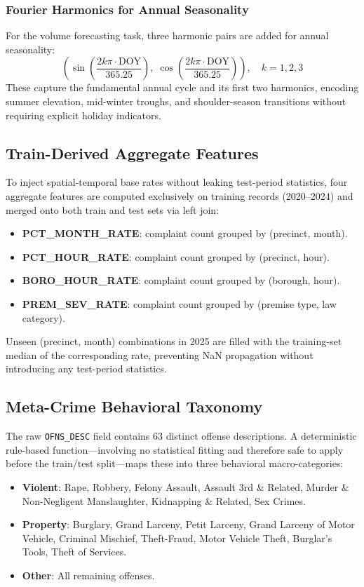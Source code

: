 \documentclass[conference]{IEEEtran}
\begin{document}
\subsubsection{Fourier Harmonics for Annual Seasonality}
For the volume forecasting task, three harmonic pairs are added for annual seasonality:
\begin{equation}
  \left(\sin\!\left(\frac{2k\pi \cdot \text{DOY}}{365.25}\right),\; \cos\!\left(\frac{2k\pi \cdot \text{DOY}}{365.25}\right)\right), \quad k = 1, 2, 3
\end{equation}
These capture the fundamental annual cycle and its first two harmonics, encoding summer elevation, mid-winter troughs, and shoulder-season transitions without requiring explicit holiday indicators.

\subsection{Train-Derived Aggregate Features}

To inject spatial-temporal base rates without leaking test-period statistics, four aggregate features are computed exclusively on training records (2020--2024) and merged onto both train and test sets via left join:
\begin{itemize}
  \item \textbf{PCT\_MONTH\_RATE}: complaint count grouped by (precinct, month).
  \item \textbf{PCT\_HOUR\_RATE}: complaint count grouped by (precinct, hour).
  \item \textbf{BORO\_HOUR\_RATE}: complaint count grouped by (borough, hour).
  \item \textbf{PREM\_SEV\_RATE}: complaint count grouped by (premise type, law category).
\end{itemize}
Unseen (precinct, month) combinations in 2025 are filled with the training-set median of the corresponding rate, preventing NaN propagation without introducing any test-period statistics.

\subsection{Meta-Crime Behavioral Taxonomy}

The raw \texttt{OFNS\_DESC} field contains 63 distinct offense descriptions. A deterministic rule-based function—involving no statistical fitting and therefore safe to apply before the train/test split—maps these into three behavioral macro-categories:
\begin{itemize}
  \item \textbf{Violent}: Rape, Robbery, Felony Assault, Assault 3rd \& Related, Murder \& Non-Negligent Manslaughter, Kidnapping \& Related, Sex Crimes.
  \item \textbf{Property}: Burglary, Grand Larceny, Petit Larceny, Grand Larceny of Motor Vehicle, Criminal Mischief, Theft-Fraud, Motor Vehicle Theft, Burglar's Tools, Theft of Services.
  \item \textbf{Other}: All remaining offenses.
\end{itemize}
\end{document}
